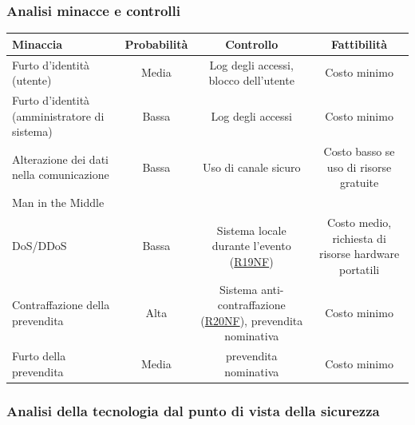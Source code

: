 \documentclass[a4paper]{article}
\begin{document}
\subsubsection{Analisi minacce e controlli}


\begin{center}
    \begin{tabulary}{1\textwidth}{L|c|C|C}
        \textbf{Minaccia} & \textbf{Probabilità} & \textbf{Controllo} & \textbf{Fattibilità}  \\
        \hline
        \hline
        Furto d’identità (utente) & Media & Log degli accessi, blocco dell'utente & Costo minimo\\
        \hline
        Furto d’identità (amministratore di sistema) & Bassa & Log degli accessi & Costo minimo\\
        \hline
        Alterazione dei dati nella comunicazione & Bassa & Uso di canale sicuro & Costo basso se uso di risorse gratuite\\
        Man in the Middle &  &  & \\
        \hline
        DoS/DDoS & Bassa & Sistema locale durante l'evento (\hyperlink{R19NF}{R19NF}) & Costo medio, richiesta di risorse hardware portatili\\
        \hline
        Contraffazione della prevendita & Alta & Sistema anti-contraffazione (\hyperlink{R20NF}{R20NF}), prevendita nominativa & Costo minimo\\
        \hline
        Furto della prevendita & Media & prevendita nominativa & Costo minimo\\
        \hline
    \end{tabulary}
\end{center}

\newpage

\subsubsection{Analisi della tecnologia dal punto di vista della sicurezza}
\end{document}
